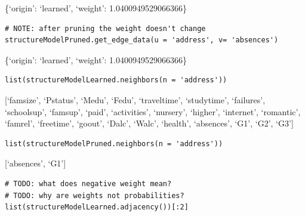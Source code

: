 \documentclass[
]{article}
\begin{document}
\{`origin': `learned', `weight': 1.0400949529066366\}

\begin{verbatim}
# NOTE: after pruning the weight doesn't change
structureModelPruned.get_edge_data(u = 'address', v= 'absences')
\end{verbatim}

\{`origin': `learned', `weight': 1.0400949529066366\}

\begin{verbatim}
list(structureModelLearned.neighbors(n = 'address'))
\end{verbatim}

{[}`famsize', `Pstatus', `Medu', `Fedu', `traveltime', `studytime',
`failures', `schoolsup', `famsup', `paid', `activities', `nursery',
`higher', `internet', `romantic', `famrel', `freetime', `goout', `Dalc',
`Walc', `health', `absences', `G1', `G2', `G3'{]}

\begin{verbatim}
list(structureModelPruned.neighbors(n = 'address'))
\end{verbatim}

{[}`absences', `G1'{]}

\begin{verbatim}
# TODO: what does negative weight mean?
# TODO: why are weights not probabilities?
list(structureModelLearned.adjacency())[:2]
\end{verbatim}
\end{document}
